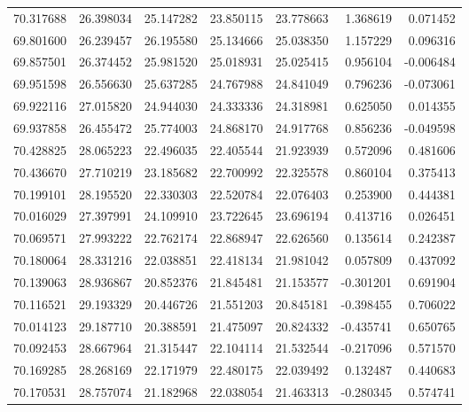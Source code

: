 \begin{tabular}{rrrrrrr}
 70.317688 &  26.398034 &         25.147282 &         23.850115 &         23.778663 &  1.368619 &  0.071452 \\
 69.801600 &  26.239457 &         26.195580 &         25.134666 &         25.038350 &  1.157229 &  0.096316 \\
 69.857501 &  26.374452 &         25.981520 &         25.018931 &         25.025415 &  0.956104 & -0.006484 \\
 69.951598 &  26.556630 &         25.637285 &         24.767988 &         24.841049 &  0.796236 & -0.073061 \\
 69.922116 &  27.015820 &         24.944030 &         24.333336 &         24.318981 &  0.625050 &  0.014355 \\
 69.937858 &  26.455472 &         25.774003 &         24.868170 &         24.917768 &  0.856236 & -0.049598 \\
 70.428825 &  28.065223 &         22.496035 &         22.405544 &         21.923939 &  0.572096 &  0.481606 \\
 70.436670 &  27.710219 &         23.185682 &         22.700992 &         22.325578 &  0.860104 &  0.375413 \\
 70.199101 &  28.195520 &         22.330303 &         22.520784 &         22.076403 &  0.253900 &  0.444381 \\
 70.016029 &  27.397991 &         24.109910 &         23.722645 &         23.696194 &  0.413716 &  0.026451 \\
 70.069571 &  27.993222 &         22.762174 &         22.868947 &         22.626560 &  0.135614 &  0.242387 \\
 70.180064 &  28.331216 &         22.038851 &         22.418134 &         21.981042 &  0.057809 &  0.437092 \\
 70.139063 &  28.936867 &         20.852376 &         21.845481 &         21.153577 & -0.301201 &  0.691904 \\
 70.116521 &  29.193329 &         20.446726 &         21.551203 &         20.845181 & -0.398455 &  0.706022 \\
 70.014123 &  29.187710 &         20.388591 &         21.475097 &         20.824332 & -0.435741 &  0.650765 \\
 70.092453 &  28.667964 &         21.315447 &         22.104114 &         21.532544 & -0.217096 &  0.571570 \\
 70.169285 &  28.268169 &         22.171979 &         22.480175 &         22.039492 &  0.132487 &  0.440683 \\
 70.170531 &  28.757074 &         21.182968 &         22.038054 &         21.463313 & -0.280345 &  0.574741 \\

\end{tabular}
